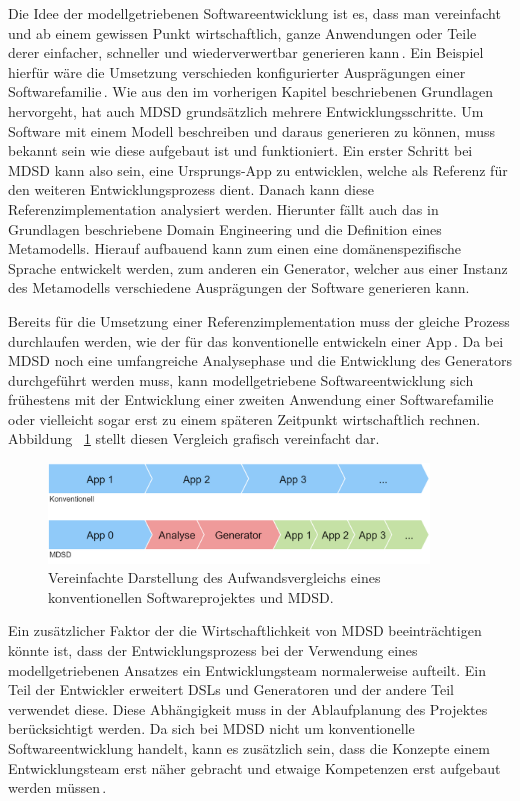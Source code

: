 \documentclass[12pt,oneside,a4paper,parskip]{scrbook}
\begin{document}
Die Idee der modellgetriebenen Softwareentwicklung ist es, dass man vereinfacht und ab einem gewissen Punkt wirtschaftlich, ganze Anwendungen oder Teile derer einfacher, schneller und wiederverwertbar generieren kann\,\cite[S. 14f.]{stahl2007}. Ein Beispiel hierfür wäre die Umsetzung verschieden konfigurierter Ausprägungen einer Softwarefamilie\,\cite[S. 237ff.]{stahl2007}. Wie aus den im vorherigen Kapitel beschriebenen Grundlagen hervorgeht, hat auch MDSD grundsätzlich mehrere Entwicklungsschritte. Um Software mit einem Modell beschreiben und daraus generieren zu können, muss bekannt sein wie diese aufgebaut ist und funktioniert. Ein erster Schritt bei MDSD kann also sein, eine Ursprungs-App zu entwicklen, welche als Referenz für den weiteren Entwicklungsprozess dient. Danach kann diese Referenzimplementation analysiert werden. Hierunter fällt auch das in Grundlagen beschriebene Domain Engineering und die Definition eines Metamodells. Hierauf aufbauend kann zum einen eine domänenspezifische Sprache entwickelt werden, zum anderen ein Generator, welcher aus einer Instanz des Metamodells verschiedene Ausprägungen der Software generieren kann.

Bereits für die Umsetzung einer Referenzimplementation muss der gleiche Prozess durchlaufen werden, wie der für das konventionelle entwickeln einer App\,\cite[S. 219f.]{stahl2007}. Da bei MDSD noch eine umfangreiche Analysephase und die Entwicklung des Generators durchgeführt werden muss, kann modellgetriebene Softwareentwicklung sich frühestens mit der Entwicklung einer zweiten Anwendung einer Softwarefamilie oder vielleicht sogar erst zu einem späteren Zeitpunkt wirtschaftlich rechnen. Abbildung ~\ref{fig:vgl1} stellt diesen Vergleich grafisch vereinfacht dar.

\begin{figure}[htbp]
	\centering
	\includegraphics[width=0.9\textwidth]{bilder/vergleich_1}
	\caption{Vereinfachte Darstellung des Aufwandsvergleichs eines konventionellen Softwareprojektes und MDSD.}
	\label{fig:vgl1}
\end{figure}

Ein zusätzlicher Faktor der die Wirtschaftlichkeit von MDSD beeinträchtigen könnte ist, dass der Entwicklungsprozess bei der Verwendung eines modellgetriebenen Ansatzes ein Entwicklungsteam normalerweise aufteilt. Ein Teil der Entwickler erweitert DSLs und Generatoren und der andere Teil verwendet diese. Diese Abhängigkeit muss in der Ablaufplanung des Projektes berücksichtigt werden. Da sich bei MDSD nicht um konventionelle Softwareentwicklung handelt, kann es zusätzlich sein, dass die Konzepte einem Entwicklungsteam erst näher gebracht und etwaige Kompetenzen erst aufgebaut werden müssen\,\cite[S. 44ff.]{voelter2013}.
\end{document}
